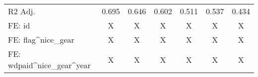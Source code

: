 \begin{table}
\begin{tabular}[t]{lcccccc}
\hspace{1em}R2 Adj. & 0.695 & 0.646 & 0.602 & 0.511 & 0.537 & 0.434\\
\hspace{1em}FE: id & X & X & X & X & X & X\\
\hspace{1em}FE: flag\textasciicircum{}nice\_gear & X & X & X & X & X & X\\
\hspace{1em}FE: wdpaid\textasciicircum{}nice\_gear\textasciicircum{}year & X & X & X & X & X & X\\
\bottomrule
\end{tabular}
\end{table}